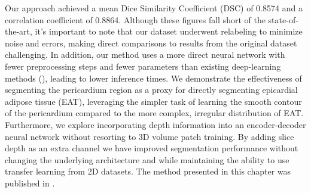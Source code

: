 Our approach achieved a mean Dice Similarity Coefficient (DSC) of 0.8574 and a correlation coefficient of 0.8864. Although these figures fall short of the state-of-the-art, it's important to note that our dataset underwent relabeling to minimize noise and errors, making direct comparisons to results from the original dataset challenging. In addition, our method uses a more direct neural network with fewer preprocessing steps and fewer parameters than existing deep-learning methods (\cite{Commandeur2018, Li2019, he2020}), leading to lower inference times.  We demonstrate the effectiveness of segmenting the pericardium region as a proxy for directly segmenting epicardial adipose tissue (EAT), leveraging the simpler task of learning the smooth contour of the pericardium compared to the more complex, irregular distribution of EAT. Furthermore, we explore incorporating depth information into an encoder-decoder neural network without resorting to 3D volume patch training. By adding slice depth as an extra channel we have improved segmentation performance without changing the underlying architecture and while maintaining the ability to use transfer learning from 2D datasets. The method presented in this chapter was published in \cite{bencevicEpicardialAdiposeTissue2021}.
